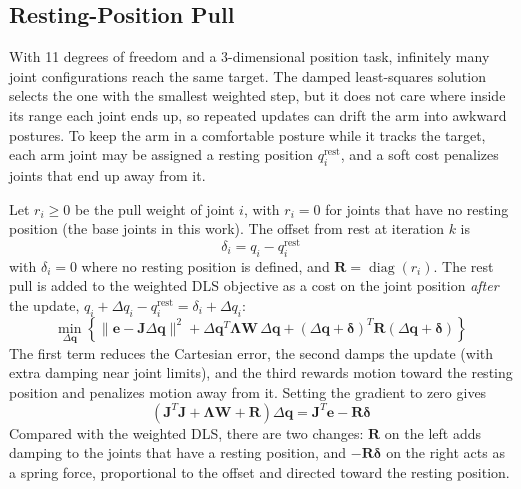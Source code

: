 \documentclass[12pt,a4paper]{article}
\begin{document}
\subsection*{Resting-Position Pull}
With 11 degrees of freedom and a 3-dimensional position task, infinitely many joint configurations reach the same target. The damped least-squares solution selects the one with the smallest weighted step, but it does not care where inside its range each joint ends up, so repeated updates can drift the arm into awkward postures. To keep the arm in a comfortable posture while it tracks the target, each arm joint may be assigned a resting position $q_i^{\mathrm{rest}}$, and a soft cost penalizes joints that end up away from it.

Let $r_i \ge 0$ be the pull weight of joint $i$, with $r_i=0$ for joints that have no resting position (the base joints in this work). The offset from rest at iteration $k$ is
\begin{equation}
    \delta_i = q_i - q_i^{\mathrm{rest}}
\end{equation}
with $\delta_i=0$ where no resting position is defined, and $\mathbf{R}=\operatorname{diag}(r_i)$. The rest pull is added to the weighted DLS objective as a cost on the joint position \emph{after} the update, $q_i+\Delta q_i-q_i^{\mathrm{rest}}=\delta_i+\Delta q_i$:
\begin{equation}
    \min_{\Delta\mathbf{q}}
    \left\{
        \|\mathbf{e}-\mathbf{J}\Delta\mathbf{q}\|^2
        + \Delta\mathbf{q}^{T}\boldsymbol{\Lambda}\mathbf{W}\,\Delta\mathbf{q}
        + \left(\Delta\mathbf{q}+\boldsymbol{\delta}\right)^{T}\mathbf{R}\left(\Delta\mathbf{q}+\boldsymbol{\delta}\right)
    \right\}
    \label{eq:rest_objective}
\end{equation}
The first term reduces the Cartesian error, the second damps the update (with extra damping near joint limits), and the third rewards motion toward the resting position and penalizes motion away from it. Setting the gradient to zero gives
\begin{equation}
    \left(\mathbf{J}^{T}\mathbf{J} + \boldsymbol{\Lambda}\mathbf{W} + \mathbf{R}\right)\Delta\mathbf{q}
    = \mathbf{J}^{T}\mathbf{e} - \mathbf{R}\boldsymbol{\delta}
    \label{eq:rest_normal}
\end{equation}
Compared with the weighted DLS, there are two changes: $\mathbf{R}$ on the left adds damping to the joints that have a resting position, and $-\mathbf{R}\boldsymbol{\delta}$ on the right acts as a spring force, proportional to the offset and directed toward the resting position.
\end{document}
